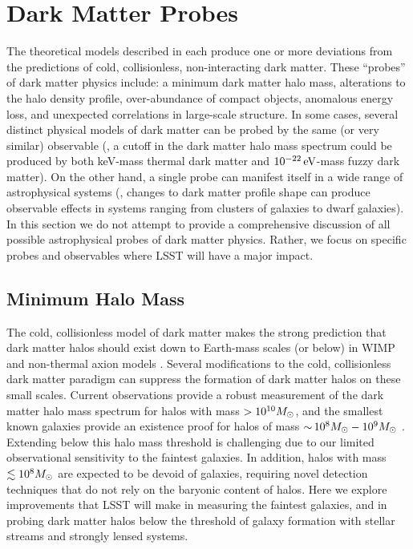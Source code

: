 \documentclass[modern,linenumbers]{aastex62}
\begin{document}

\section{Dark Matter Probes}
\label{sec:probes}

The theoretical models described in  each produce one or more deviations from the predictions of cold, collisionless, non-interacting dark matter.
These ``probes'' of dark matter physics include: a minimum dark matter halo mass, alterations to the halo density profile, over-abundance of compact objects, anomalous energy loss, and unexpected correlations in large-scale structure.
In some cases, several distinct physical models of dark matter can be probed by the same (or very similar) observable (\eg, a cutoff in the dark matter halo mass spectrum could be produced by both keV-mass thermal dark matter and $10^{-22}\mathrm{\,eV}$-mass fuzzy dark matter). 
On the other hand, a single probe can manifest itself in a wide range of astrophysical systems (\eg, changes to dark matter profile shape can produce observable effects in systems ranging from clusters of galaxies to dwarf galaxies).
In this section we do not attempt to provide a comprehensive discussion of all possible astrophysical probes of dark matter physics.
Rather, we focus on specific probes and observables where LSST will have a major impact.

\subsection{Minimum Halo Mass}
\label{sec:halo_mass}

The cold, collisionless model of dark matter makes the strong prediction that dark matter halos should exist down to Earth-mass scales (or below) in WIMP and non-thermal axion models \citep{Green:2003un,1412.5930}.
Several modifications to the cold, collisionless dark matter paradigm can suppress the formation of dark matter halos on these small scales.
Current observations provide a robust measurement of the dark matter halo mass spectrum for halos with mass $> 10^{10}M_\odot$, and the smallest known galaxies provide an existence proof for halos of mass $ {\sim}\, 10^8 M_\odot - 10^9 M_\odot$ \citep{behroozi2018,Jethwa:2018,Kim:2017iwr,Nadler:2018}. 
Extending below this halo mass threshold is challenging due to our limited observational sensitivity to the faintest galaxies.
In addition, halos with mass $\lesssim 10^8 M_\odot$ are expected to be devoid of galaxies, requiring novel detection techniques that do not rely on the baryonic content of halos.
Here we explore improvements that LSST will make in measuring the faintest galaxies, and in probing dark matter halos below the threshold of galaxy formation with stellar streams and strongly lensed systems.
\end{document}
